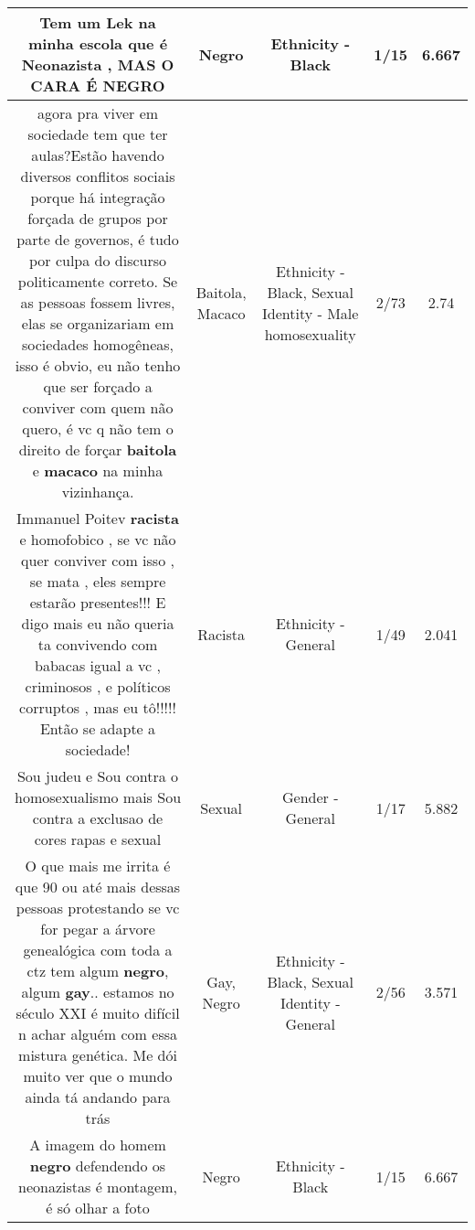 \documentclass[11pt]{article}
\newlength\mylength
\begin{document}
\begin{center}
\begin{longtable}{|C{.65\mylength}|C{.30\mylength}|C{.12\mylength}|C{.12\mylength}|C{.12\mylength}|}
  \small Tem um Lek na minha escola que é Neonazista , MAS O CARA É NEGRO\normalsize   & Negro & Ethnicity - Black & 1/15 & 6.667 \\  \hline
  \small agora pra viver em sociedade tem que ter aulas?Estão havendo diversos conflitos sociais porque há integração forçada de grupos por parte de governos, é tudo por culpa do discurso politicamente correto. Se as pessoas fossem livres, elas se organizariam em sociedades homogêneas, isso é obvio, eu não tenho que ser forçado a conviver com quem não quero, é vc q não tem o direito de forçar \textbf{baitola} e \textbf{macaco} na minha vizinhança.\normalsize   & Baitola, Macaco & Ethnicity - Black, Sexual Identity - Male homosexuality & 2/73 & 2.74 \\  \hline
  \small Immanuel Poitev  \textbf{racista} e homofobico , se vc não quer conviver com isso , se mata , eles sempre estarão presentes!!! E digo mais eu não queria ta convivendo com babacas igual a vc ,  criminosos , e políticos corruptos , mas eu tô!!!!! Então se adapte a sociedade!\normalsize   & Racista & Ethnicity - General & 1/49 & 2.041 \\  \hline
  \small Sou judeu e Sou contra o homosexualismo mais Sou contra a exclusao de cores rapas e sexual\normalsize   & Sexual & Gender - General & 1/17 & 5.882 \\  \hline
  \small O que mais me irrita é que 90 ou até mais dessas pessoas protestando se vc for pegar a árvore genealógica com toda a ctz tem algum \textbf{negro}, algum \textbf{gay}.. estamos no século XXI é muito difícil n achar alguém com essa mistura genética. Me dói muito ver que o mundo ainda tá andando para trás\normalsize   & Gay, Negro & Ethnicity - Black, Sexual Identity - General & 2/56 & 3.571 \\  \hline
  \small A imagem do homem \textbf{negro} defendendo os neonazistas é montagem, é só olhar a foto\normalsize   & Negro & Ethnicity - Black & 1/15 & 6.667 \\  \hline

\end{longtable}
\end{center}
\end{document}
